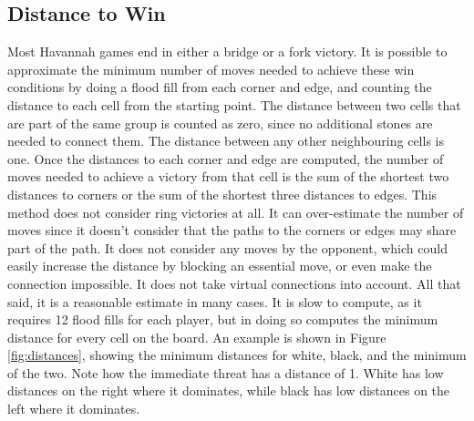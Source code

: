 \subsection{Distance to Win}\label{sec:distwin}

Most Havannah games end in either a bridge or a fork victory. It is possible to approximate the minimum number of moves needed to achieve these win conditions by doing a flood fill from each corner and edge, and counting the distance to each cell from the starting point. The distance between two cells that are part of the same group is counted as zero, since no additional stones are needed to connect them. The distance between any other neighbouring cells is one. Once the distances to each corner and edge are computed, the number of moves needed to achieve a victory from that cell is the sum of the shortest two distances to corners or the sum of the shortest three distances to edges. This method does not consider ring victories at all. It can over-estimate the number of moves since it doesn't consider that the paths to the corners or edges may share part of the path. It does not consider any moves by the opponent, which could easily increase the distance by blocking an essential move, or even make the connection impossible. It does not take virtual connections into account. All that said, it is a reasonable estimate in many cases. It is slow to compute, as it requires 12 flood fills for each player, but in doing so computes the minimum distance for every cell on the board. An example is shown in Figure \ref{fig:distances}, showing the minimum distances for white, black, and the minimum of the two. Note how the immediate threat has a distance of 1. White has low distances on the right where it dominates, while black has low distances on the left where it dominates.

